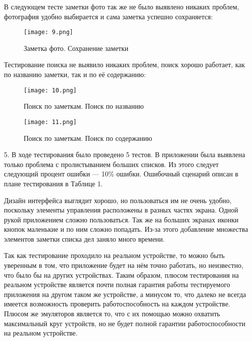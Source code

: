 \documentclass[12pt]{article}
\begin{document}
    \newpage

    В следующем тесте заметки фото так же не было выявлено никаких проблем, фотография удобно выбирается и сама заметка успешно сохраняется:

    \begin{figure}[h]
        \texttt{[image: 9.png]}
        \centering
        \caption{Заметка фото. Сохранение заметки}
    \end{figure}

    \newpage

    Тестирование поиска не выявило никаких проблем, поиск хорошо работает, как по названию заметки, так и по её содержанию:

    \begin{figure}[h]
        \texttt{[image: 10.png]}
        \centering
        \caption{Поиск по заметкам. Поиск по названию}
    \end{figure}

    \newpage

    \begin{figure}[h]
        \texttt{[image: 11.png]}
        \centering
        \caption{Поиск по заметкам. Поиск по содержанию}
    \end{figure}


    5. В ходе тестирования было проведено 5 тестов. В приложении была выявлена только проблема с пролистыванием больших списков. Из этого следует следующий процент ошибки --- 10\% ошибки. Ошибочный сценарий описан в плане тестирования в Таблице 1.

    Дизайн интерфейса выглядит хорошо, но пользоваться им не очень удобно, поскольку элементы управления расположены в разных частях экрана. Одной рукой приложением сложно пользоваться. Так же на больших экранах иконки кнопок маленькие и по ним сложно попадать. Из-за этого добавление множества элементов заметки списка дел заняло много времени.

    Так как тестирование проходило на реальном устройстве, то можно быть уверенным в том, что приложение будет на нём точно работать, но неизвестно, что было бы на других устройствах. Таким образом, плюсом тестирования на реальном устройстве является почти полная гарантия работы тестируемого приложения на другом таком же устройстве, а минусом то, что далеко не всегда имеется возможность проверить работоспособность на каждом устройстве. Плюсом же эмуляторов является то, что с их помощью можно охватить максимальный круг устройств, но не будет полной гарантии работоспособности на реальном устройстве.
\end{document}
